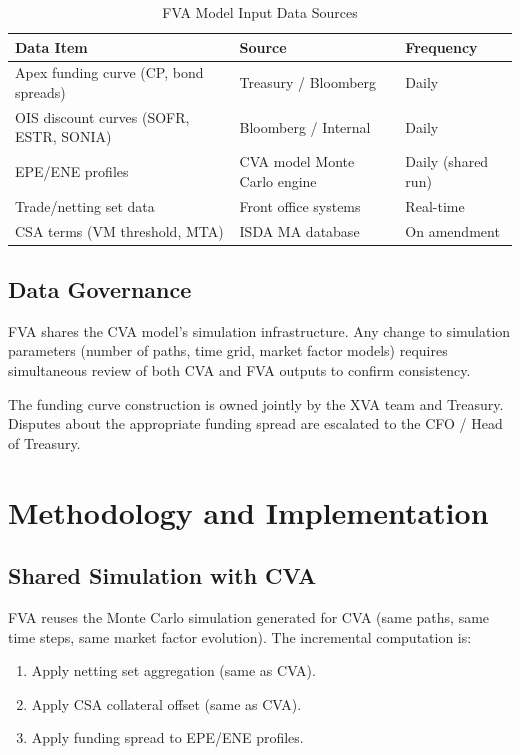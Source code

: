 \documentclass[11pt,a4paper]{article}
\begin{document}
\begin{table}[h!]
\centering
\caption{FVA Model Input Data Sources}
\begin{tabular}{@{}lll@{}}
\toprule
\textbf{Data Item} & \textbf{Source} & \textbf{Frequency} \\
\midrule
Apex funding curve (CP, bond spreads) & Treasury / Bloomberg & Daily \\
OIS discount curves (SOFR, ESTR, SONIA) & Bloomberg / Internal & Daily \\
EPE/ENE profiles & CVA model Monte Carlo engine & Daily (shared run) \\
Trade/netting set data & Front office systems & Real-time \\
CSA terms (VM threshold, MTA) & ISDA MA database & On amendment \\
\bottomrule
\end{tabular}
\end{table}

\subsection{Data Governance}

FVA shares the CVA model's simulation infrastructure. Any change to simulation parameters
(number of paths, time grid, market factor models) requires simultaneous review of both CVA and
FVA outputs to confirm consistency.

The funding curve construction is owned jointly by the XVA team and Treasury. Disputes about
the appropriate funding spread are escalated to the CFO / Head of Treasury.

\section{Methodology and Implementation}

\subsection{Shared Simulation with CVA}

FVA reuses the Monte Carlo simulation generated for CVA (same paths, same time steps, same
market factor evolution). The incremental computation is:
\begin{enumerate}[leftmargin=*]
  \item Apply netting set aggregation (same as CVA).
  \item Apply CSA collateral offset (same as CVA).
  \item Apply funding spread to EPE/ENE profiles.
\end{enumerate}
\end{document}
